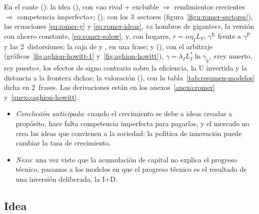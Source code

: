 \documentclass[11pt]{article}
\begin{document}
\begin{notaopositor}
En el cante (): la idea (), con «no rival + excluible $\Rightarrow$ rendimientos crecientes $\Rightarrow$ competencia imperfecta»;  (), con los 3~sectores (figura~\ref{figu:romer-sectores}), las ecuaciones \eqref{eq:romer-y} y \eqref{eq:romer-ideas}, «a hombros de gigantes», la versión con ahorro constante, \eqref{eq:romer-solow}, y, con hogares, $r=\alpha\eta_IL_Y$, $\gamma^{\mathrm E}$ frente a $\gamma^{\mathrm P}$ y las 2~distorsiones; la caja de  y , en una frase;  y  (), con el arbitraje (gráficos~\ref{fig:aghion-howitt-1} y~\ref{fig:aghion-howitt}), $\gamma=\lambda_IL_I^*\ln\gamma_q$, «rey muerto, rey puesto», los efectos de signo contrario sobre la eficiencia, la U invertida y la distancia a la frontera dichas; la valoración (), con la tabla~\ref{tab:resumen-modelos} dicha en 2~frases. Las derivaciones están en los anexos~\ref{anexo:romer} y~\ref{anexo:aghion-howitt}.
\end{notaopositor}

\begin{itemize}
\item \emph{Conclusión anticipada}: cuando el crecimiento se debe a ideas creadas a propósito, hace falta competencia imperfecta para pagarlas, y el mercado no crea las ideas que convienen a la sociedad: la política de innovación puede cambiar la tasa de crecimiento.
\item \emph{Nexo}: una vez visto que la acumulación de capital no explica el progreso técnico, pasamos a los modelos en que el progreso técnico es el resultado de una inversión deliberada, la I+D.
\end{itemize}

\subsection{Idea}\label{sec:sg-idea}
\end{document}
